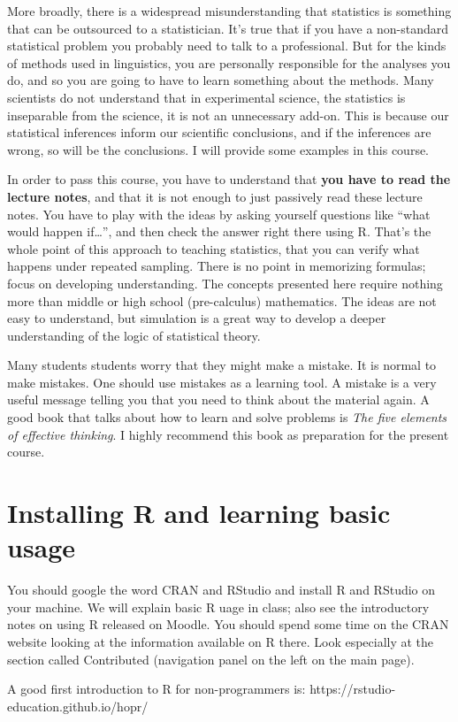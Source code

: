 \documentclass[12pt]{book}
\begin{document}
More broadly, there is a widespread misunderstanding that statistics is something that can be outsourced to a statistician. It's true that if you have a non-standard statistical problem you probably need to talk to a professional. But for the kinds of methods used in linguistics, you are personally responsible for the analyses you do, and so you are going to have to learn something about the methods. Many scientists do not understand that in experimental science, the statistics is inseparable from the science, it is not an unnecessary add-on. This is because our statistical inferences inform our scientific conclusions, and if the inferences are wrong, so will be the conclusions. I will provide some examples in this course.

In order to pass this course, you have to understand that \textbf{you have to read the lecture notes}, and that
it is not enough to just passively read these lecture notes. You have to play with the ideas by asking yourself questions like ``what would happen if\dots'', and then check the answer right there using R. That's the whole point of this approach to teaching statistics, that you can verify what happens under repeated sampling. There is no point in memorizing formulas; focus on developing understanding. The concepts presented here require nothing more than middle or high school (pre-calculus) mathematics. The ideas are not easy to understand, but simulation is a great way to develop a deeper understanding of the logic of statistical theory.

Many students students worry that they might make a mistake.  It is normal to make mistakes. One should use mistakes as a learning tool. A mistake is a very useful message telling you that you need to think about the material again. A good book that talks about how to learn and solve problems is \textit{The five elements of effective thinking}. I highly recommend this book as preparation for the present course.

\section{Installing R and learning basic usage}

You should google the word CRAN and RStudio and install R and RStudio on your machine. We will explain basic R uage in class; also see the introductory notes on using R released on Moodle.
You should spend some time on the CRAN website looking at the information available on R there. Look especially at the section called Contributed (navigation panel on the left on the main page).

A good first introduction to R for non-programmers is: https://rstudio-education.github.io/hopr/


%


\backmatter%
%
%




\end{document}
